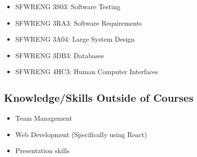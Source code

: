 \documentclass{article}
\begin{document}
\begin{itemize}
    \item SFWRENG 3S03: Software Testing
    \item SFWRENG 3RA3: Software Requirements
    \item SFWRENG 3A04: Large System Design
    \item SFWRENG 3DB3: Databases
    \item SFWRENG 4HC3: Human Computer Interfaces
\end{itemize}


\subsection{Knowledge/Skills Outside of Courses}

\begin{itemize}
    \item Team Management
    \item Web Development (Specifically using React)
    \item Presentation skills
\end{itemize}

\end{document}
